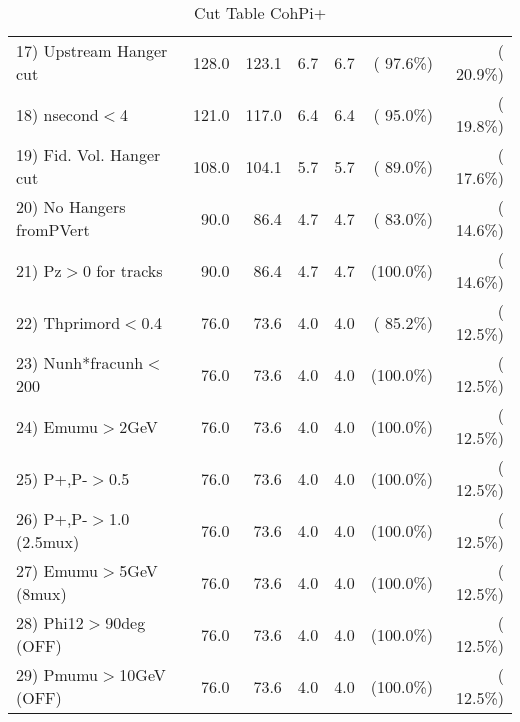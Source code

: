 \begin{table}[h!]
\begin{tabular}{||l||r|r|r|r|r|r||}
 17) Upstream Hanger cut  &        128.0 &        123.1 &          6.7 &          6.7 & ( 97.6\%) & ( 20.9\%) \\
 18) nsecond$<$4          &        121.0 &        117.0 &          6.4 &          6.4 & ( 95.0\%) & ( 19.8\%) \\
 19) Fid. Vol. Hanger cut &        108.0 &        104.1 &          5.7 &          5.7 & ( 89.0\%) & ( 17.6\%) \\
 20) No Hangers fromPVert &         90.0 &         86.4 &          4.7 &          4.7 & ( 83.0\%) & ( 14.6\%) \\
 21) Pz$>$0 for tracks    &         90.0 &         86.4 &          4.7 &          4.7 & (100.0\%) & ( 14.6\%) \\
 22) Thprimord$<$0.4      &         76.0 &         73.6 &          4.0 &          4.0 & ( 85.2\%) & ( 12.5\%) \\
 23) Nunh*fracunh$<$200   &         76.0 &         73.6 &          4.0 &          4.0 & (100.0\%) & ( 12.5\%) \\
 24) Emumu$>$2GeV         &         76.0 &         73.6 &          4.0 &          4.0 & (100.0\%) & ( 12.5\%) \\
 25) P+,P-$>$0.5          &         76.0 &         73.6 &          4.0 &          4.0 & (100.0\%) & ( 12.5\%) \\
 26) P+,P-$>$1.0 (2.5mux) &         76.0 &         73.6 &          4.0 &          4.0 & (100.0\%) & ( 12.5\%) \\
 27) Emumu$>$5GeV  (8mux) &         76.0 &         73.6 &          4.0 &          4.0 & (100.0\%) & ( 12.5\%) \\
 28) Phi12$>$90deg  (OFF) &         76.0 &         73.6 &          4.0 &          4.0 & (100.0\%) & ( 12.5\%) \\
 29) Pmumu$>$10GeV  (OFF) &         76.0 &         73.6 &          4.0 &          4.0 & (100.0\%) & ( 12.5\%) \\
 \hline
 \hline
 \end{tabular}
 \caption{Cut Table  CohPi+   }
 \label{tab-cutcohjpsi-mumu_nuecc}
 \end{table}

